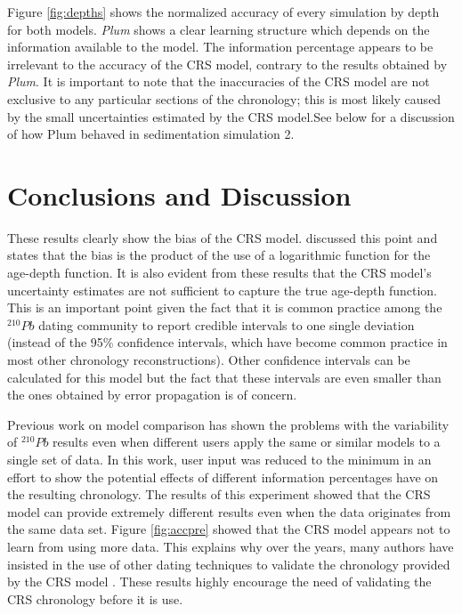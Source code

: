 \documentclass [10pt] {article}
\begin{document}
Figure \ref{fig:depths} shows the normalized accuracy of every simulation by depth for both models.
\textit{Plum} shows a clear learning structure which depends on the information available to the model.
The information percentage appears to be irrelevant to the accuracy of the CRS model, contrary to the results obtained by \textit{Plum}.
It is important to note that the inaccuracies of the CRS model are not exclusive to any particular sections of the chronology; this is most likely caused by the small uncertainties estimated by the CRS model.See below for a discussion of how Plum behaved in sedimentation simulation 2.   


\section{Conclusions and Discussion}

These results clearly show the bias of the CRS model. 
\citet{Aquino2018} discussed this point and states that the bias is the product of the use of a logarithmic function for the age-depth function. 
It is also evident from these results that the CRS model's uncertainty estimates are not sufficient to capture the true age-depth function. 
This is an important point given the fact that it is common practice among the $^{210}Pb$ dating community to report credible intervals to one single deviation (instead of the 95\% confidence intervals, which have become common practice in most other chronology reconstructions).
Other confidence intervals can be calculated for this model \citep{Sanchez-Cabeza2014} but the fact that these intervals are even smaller than the ones obtained by error propagation \citep{Appleby2001} is of concern. 

Previous work on model comparison \citep{Barsanti2020} has shown the problems with the variability of $^{210}Pb$ results even when different users apply the same or similar models to a single set of data.
In this work, user input was reduced to the minimum in an effort to show the potential effects of different information percentages have on the resulting chronology. 
The results of this experiment showed that the CRS model can provide extremely different results even when the data originates from the same data set. 
Figure \ref{fig:accpre} showed that the CRS model appears not to learn from using more data.
This explains why over the years, many authors have insisted in the use of other dating techniques to validate the chronology provided by the CRS model \citep{Sanchez-Cabeza2012,Barsanti2020,Aquino2020}.
These results highly encourage the need of validating the CRS chronology before it is use.
\end{document}
